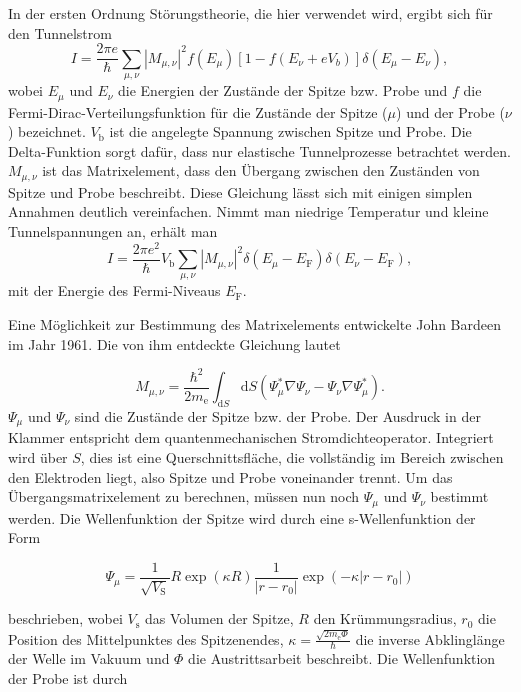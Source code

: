 \documentclass[
	a4paper,
	12pt,
	pagesize,
	ngerman
]{scrartcl}
\begin{document}
In der ersten Ordnung Störungstheorie, die hier verwendet wird, ergibt sich für den Tunnelstrom
\begin{equation}
	I = \frac{2\pi e}{\hbar} \sum_{\mu, \nu} |M_{\mu,\nu}|^2 f(E_\mu)[1-f(E_\nu + eV_b)] \delta(E_\mu - E_\nu),
	\label{eq:I1}
\end{equation}
wobei $E_\mu$ und $E_\nu$ die Energien der Zustände der Spitze bzw. Probe und $f$ die Fermi-Dirac-Verteilungsfunktion für die Zustände der Spitze ($\mu$) und der Probe ($\nu$) bezeichnet. $V_\text{b}$ ist die angelegte Spannung zwischen Spitze und Probe. Die Delta-Funktion sorgt dafür, dass nur elastische Tunnelprozesse betrachtet werden. $M_{\mu,\nu}$ ist das Matrixelement, dass den Übergang zwischen den Zuständen von Spitze und Probe beschreibt. Diese Gleichung lässt sich mit einigen simplen Annahmen deutlich vereinfachen. Nimmt man niedrige Temperatur und kleine Tunnelspannungen an, erhält man
\begin{equation}
	I = \frac{2\pi e^2}{\hbar}V_\text{b} \sum_{\mu, \nu} |M_{\mu,\nu}|^2 \delta(E_\mu - E_\text{F}) \delta(E_\nu - E_\text{F}),
	\label{eq:I2}
\end{equation}
mit der Energie des Fermi-Niveaus $E_\text{F}$.

Eine Möglichkeit zur Bestimmung des Matrixelements entwickelte John Bardeen im Jahr 1961. \cite{1} Die von ihm entdeckte Gleichung lautet

\begin{equation}
	M_{\mu,\nu} = \frac{\hbar^2}{2m_\text{e}} \int_{\text{d}S} \text{d}S(\Psi_\mu^* \nabla \Psi_\nu - \Psi_\nu \nabla \Psi_\mu^*).
	\label{eq:M}
\end{equation}
$\Psi_\mu$ und $\Psi_\nu$ sind die Zustände der Spitze bzw. der Probe. Der Ausdruck in der Klammer entspricht dem quantenmechanischen Stromdichteoperator. Integriert wird über $S$, dies ist eine Querschnittsfläche, die vollständig im Bereich zwischen den Elektroden liegt, also Spitze und Probe voneinander trennt. Um das Übergangsmatrixelement zu berechnen, müssen nun noch $\Psi_\mu$ und $\Psi_\nu$ bestimmt werden. Die Wellenfunktion der Spitze wird durch eine s-Wellenfunktion der Form

\begin{equation}
	\Psi_\mu = \frac{1}{\sqrt{V_\text{S}}} R \exp(\kappa R) \frac{1}{|r-r_0|} \exp(-\kappa|r-r_0|)
	\label{eq:psimu}
\end{equation}

beschrieben, wobei $V_\text{s}$ das Volumen der Spitze, $R$ den Krümmungsradius, $r_0$ die Position des Mittelpunktes des Spitzenendes, $\kappa = \frac{\sqrt{2m_\text{e}\Phi}}{\hbar}$ die inverse Abklinglänge der Welle im Vakuum und $\Phi$ die Austrittsarbeit beschreibt. Die Wellenfunktion der Probe ist durch
\end{document}

